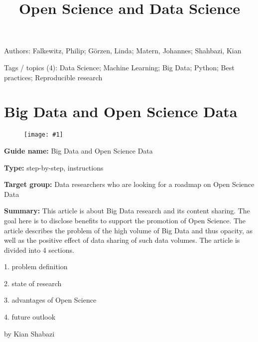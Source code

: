 \documentclass{article}
\newlength{\imgwidth}
\newcommand\scaledgraphics[2]{%
                
\settowidth{\imgwidth}{\texttt{[image: \#1]}}%
                
\setlength{\imgwidth}{\minof{\imgwidth}{#2\textwidth}}%
                
\texttt{[image: \#1]}%
                
}
\begin{document}
\title{Open Science and Data Science}

\maketitle


Authors: Falkewitz, Philip;  Görzen, Linda; Matern, Johannes;  Shahbazi, Kian 


Tags / topics (4): Data Science; Machine Learning; Big Data; Python; Best practices; Reproducible research





\section{Big Data and Open Science Data}\label{H6205473}



\begin{center}
\begin{figure}
\scaledgraphics{25f071a6-9aec-4c08-bfd3-bfb548adfaee.jpg}{0.5}
\label{F77040021}
\end{figure}


\end{center}


 


\textbf{Guide name:} Big Data and Open Science Data \autocite{gutierrez_big_2015}


\textbf{Type:} step-by-step, instructions


\textbf{Target group:} Data researchers who are looking for a roadmap on Open Science Data


\textbf{Summary:} This article is about Big Data research and its content sharing. The goal here is to disclose benefits to support the promotion of Open Science. The article describes the problem of the high volume of Big Data and thus opacity, as well as the positive effect of data sharing of such data volumes. The article is divided into 4 sections.


1. problem definition


2. state of research


3. advantages of Open Science


4. future outlook





by Kian Shabazi
\end{document}

